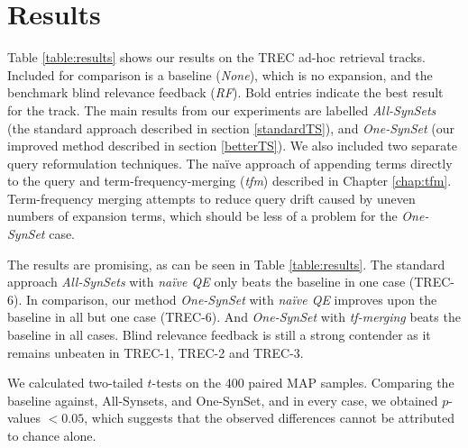 \section{Results}
Table \ref{table:results} shows our results on the TREC ad-hoc retrieval tracks. Included for comparison is a baseline (\textit{None}), which is no expansion, and the benchmark blind relevance feedback (\textit{RF}). Bold entries indicate the best result for the track. The main results from our experiments are labelled \textit{All-SynSets} (the standard approach described in section \ref{standardTS}), and \textit{One-SynSet} (our improved method described in section \ref{betterTS}). We also included two separate query reformulation techniques. The na{\"i}ve approach of appending terms directly to the query and term-frequency-merging (\textit{tfm}) \cite{Crimp:2017:ATR:3166072.3166074} described in Chapter \ref{chap:tfm}. Term-frequency merging attempts to reduce query drift caused by uneven numbers of expansion terms, which should be less of a problem for the \textit{One-SynSet} case.

The results are promising, as can be seen in Table \ref{table:results}. The standard approach \textit{All-SynSets} with \textit{na{\"i}ve QE} only beats the baseline in one case (TREC-6). In comparison, our method \textit{One-SynSet} with \textit{na{\"i}ve QE} improves upon the baseline in all but one case (TREC-6). And \textit{One-SynSet} with \textit{tf-merging} beats the baseline in all cases. Blind relevance feedback is still a strong contender as it remains unbeaten in TREC-1, TREC-2 and TREC-3.


We calculated two-tailed $t$-tests on the 400 paired MAP samples. Comparing the baseline against, All-Synsets, and One-SynSet, and in every case, we obtained $p$-values $< 0.05$, which suggests that the observed differences cannot be attributed to chance alone.





